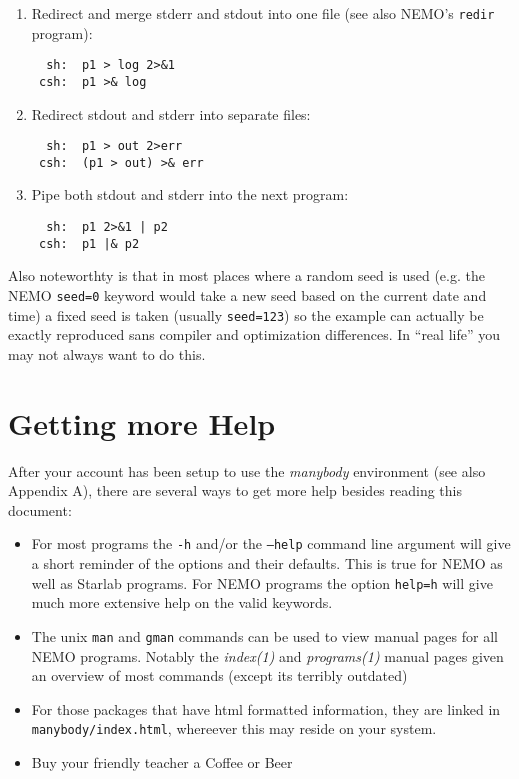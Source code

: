 \begin{enumerate}
\item 
Redirect and merge stderr and stdout into one file 
(see also NEMO's {\tt redir} program):
\footnotesize\begin{verbatim}
  sh:  p1 > log 2>&1
 csh:  p1 >& log
\end{verbatim}\normalsize
\item
Redirect stdout and stderr into separate files:
\footnotesize\begin{verbatim}
  sh:  p1 > out 2>err
 csh:  (p1 > out) >& err
\end{verbatim}\normalsize
\item
Pipe both stdout and stderr into the next program:
\footnotesize\begin{verbatim}
  sh:  p1 2>&1 | p2
 csh:  p1 |& p2
\end{verbatim}\normalsize
\end{enumerate}

Also noteworthty is that 
in most places where a random seed is used (e.g. the NEMO {\tt seed=0} keyword
would take a new seed based on the current date and time) 
a fixed seed is taken (usually {\tt seed=123}) 
so the example can actually be exactly reproduced sans compiler and optimization
differences. In ``real life'' you may not always want to do this.


\section*{Getting more Help}

After your account has been setup to use the {\it manybody} environment
(see also Appendix A), there are several ways to get more help besides
reading this document:
\begin{itemize}
\item
For most programs the {\tt -h} and/or the {\tt --help} 
command line argument will give a short
reminder of the options and their defaults. This is true for NEMO as well
as Starlab programs.
For NEMO programs the option {\tt help=h} will give much more extensive help
on the valid keywords.

\item
The unix {\tt man} and {\tt gman} commands can be used to view manual pages
for all NEMO programs. Notably the {\it index(1)} and {\it programs(1)}
manual pages given an overview of most commands (except its terribly
outdated)

\item
For those packages that have html formatted information, they are
linked in {\tt manybody/index.html}, whereever this may reside on your
system.

\item
Buy your friendly teacher a Coffee or Beer

\end{itemize}

